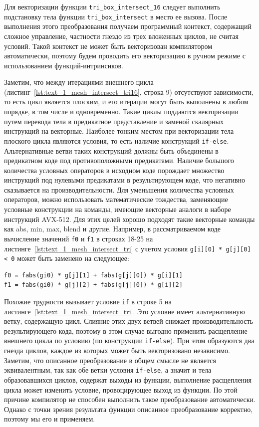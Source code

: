Для векторизации функции \texttt{tri\_box\_intersect\_16} следует выполнить подстановку тела функции \texttt{tri\_box\_intersect} в место ее вызова.
После выполнения этого преобразования получаем программный контекст, содержащий сложное управление, частности гнездо из трех вложенных циклов, не считая условий.
Такой контекст не может быть векторизован компилятором автоматически, поэтому будем проводить его векторизацию в ручном режиме с использованием функций-интринсиков\label{term:intrinsic4}.

Заметим, что между итерациями внешнего цикла (листинг~\ref{lst:text_1_mesh_intersect_tri16}, строка 9) отсутствуют зависимости, то есть цикл является плоским, и его итерации могут быть выполнены в любом порядке, в том числе и одновременно.
Такие циклы поддаются векторизации путем перевода тела в предикатное представление\label{term:predicate_view2} и заменой скалярных инструкций на векторные.
Наиболее тонким местом при векторизации тела плоского цикла являются условия, то есть наличие конструкций \texttt{if-else}.
Альтернативные ветви таких конструкций должны быть объединены в предикатном коде под противоположными предикатами.
Наличие большого количества условных операторов в исходном коде порождает множество инструкций под нулевыми предикатами в результирующем коде, что негативно сказывается на производительности.
Для уменьшения количества условных операторов, можно использовать математические тождества, заменяющие условные конструкции на команды, имеющие векторные аналоги в наборе инструкций AVX-512\label{abbr:avx6}.
Для этих целей хорошо подходят такие векторные команды как abs, min, max, blend и другие.
Например, в рассматриваемом коде вычисление значений \texttt{f0} и \texttt{f1} в строках 18-25 на листинге~\ref{lst:text_1_mesh_intersect_tri} с учетом условия \texttt{g[i][0] * g[j][0] < 0} может быть заменено на следующее:

\begin{singlespace}
\begin{lstlisting}[caption={Использование тождества для векторизации условия.},label={lst:text_4_mesh_intersect_tozh}]
f0 = fabs(gi0) * g[j][1] + fabs(g[j][0]) * g[i][1]
f1 = fabs(gi0) * g[j][2] + fabs(g[j][0]) * g[i][2]
\end{lstlisting}
\end{singlespace}

Похожие трудности вызывает условие \texttt{if} в строке 5 на листинге~\ref{lst:text_1_mesh_intersect_tri}.
Это условие имеет альтернативную ветку, содержащую цикл.
Слияние этих двух ветвей снижает производительность результирующего кода, поэтому в этом случае выгодно применить расщепление внешнего цикла по условию\label{term:loop_split_by_cond3} (по конструкции \texttt{if-else}).
При этом образуются два гнезда циклов, каждое из которых может быть векторизовано независимо.
Заметим, что описанное преобразование в общем смысле не является эквивалентным, так как обе ветки условия \texttt{if-else}, а значит и тела образовавшихся циклов, содержат выходы из функции, выполнение расщепления цикла может изменить условие, провоцирующее выход из функции.
По этой причине компилятор не способен выполнить такое преобразование автоматически.
Однако с точки зрения результата функции описанное преобразование корректно, поэтому мы его и применяем.

